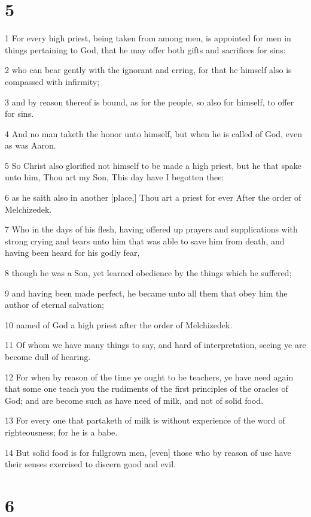 \chapter{5}

\par 1 For every high priest, being taken from among men, is appointed for men in things pertaining to God, that he may offer both gifts and sacrifices for sins:
\par 2 who can bear gently with the ignorant and erring, for that he himself also is compassed with infirmity;
\par 3 and by reason thereof is bound, as for the people, so also for himself, to offer for sins.
\par 4 And no man taketh the honor unto himself, but when he is called of God, even as was Aaron.
\par 5 So Christ also glorified not himself to be made a high priest, but he that spake unto him, Thou art my Son, This day have I begotten thee:
\par 6 as he saith also in another [place,] Thou art a priest for ever After the order of Melchizedek.
\par 7 Who in the days of his flesh, having offered up prayers and supplications with strong crying and tears unto him that was able to save him from death, and having been heard for his godly fear,
\par 8 though he was a Son, yet learned obedience by the things which he suffered;
\par 9 and having been made perfect, he became unto all them that obey him the author of eternal salvation;
\par 10 named of God a high priest after the order of Melchizedek.
\par 11 Of whom we have many things to say, and hard of interpretation, seeing ye are become dull of hearing.
\par 12 For when by reason of the time ye ought to be teachers, ye have need again that some one teach you the rudiments of the first principles of the oracles of God; and are become such as have need of milk, and not of solid food.
\par 13 For every one that partaketh of milk is without experience of the word of righteousness; for he is a babe.
\par 14 But solid food is for fullgrown men, [even] those who by reason of use have their senses exercised to discern good and evil.

\chapter{6}

